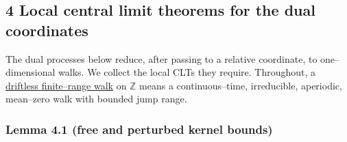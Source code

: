 \documentclass[11pt]{article}
\theoremstyle{plain}
\theoremstyle{definition}
\theoremstyle{remark}
\newcommand{\Z}{\mathbb{Z}}\newcommand{\R}{\mathbb{R}}\newcommand{\N}{\mathbb{N}}
\begin{document}
\subsection{4 Local central limit theorems for the dual coordinates}\label{sec_lclt}

The dual processes below reduce, after passing to a relative coordinate, to
one--dimensional walks. We collect the local CLTs they require. Throughout, a
\underline{driftless finite--range walk} on $\Z$ means a continuous--time, irreducible,
aperiodic, mean--zero walk with bounded jump range.

\subsubsection{Lemma 4.1 (free and perturbed kernel bounds)}\label{lem_free}
\end{document}
